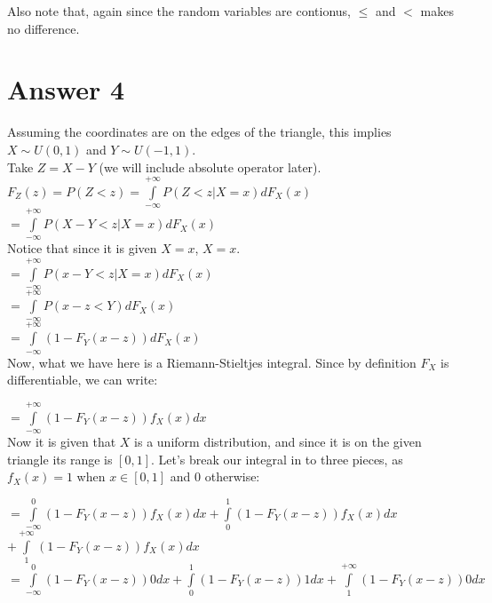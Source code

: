 \documentclass[12pt]{article}
\begin{document}
Also note that, again since the random variables are contionus, $\leq$ and $<$ makes no difference.




\section*{Answer 4}

Assuming the coordinates are on the edges of the triangle, this implies $X \sim U(0,1)$ and $Y \sim U(-1,1)$. \\

Take $Z=X-Y$ (we will include absolute operator later). \\

$F_Z(z) = P(Z<z) = \displaystyle\int\limits_{-\infty}^{+\infty} P(Z<z|X=x)dF_X(x)  $\\

$ = \displaystyle\int\limits_{-\infty}^{+\infty} P(X-Y<z | X=x)dF_X(x) $ \\

Notice that since it is given $X=x$, $X=x$.\\

$ = \displaystyle\int\limits_{-\infty}^{+\infty} P(x-Y<z | X=x)dF_X(x) $ \\

$ = \displaystyle\int\limits_{-\infty}^{+\infty} P( x-z <Y )dF_X(x) $ \\

$ = \displaystyle\int\limits_{-\infty}^{+\infty} ( 1-  F_Y(x-z) )  dF_X(x) $ \\

Now, what we have here is a Riemann-Stieltjes integral. Since by definition $F_X$ is differentiable, we can write:

$ = \displaystyle\int\limits_{-\infty}^{+\infty} ( 1-  F_Y(x-z) ) f_X(x)dx $ \\ 

Now it is given that $X$ is a uniform distribution, and since it is on the given triangle its range is $[0,1]$. Let's break our integral in to three pieces, as $f_X(x) = 1$ when $x\in [0,1]$ and $0$ otherwise:

$ =\displaystyle\int\limits_{-\infty}^{0} ( 1- F_Y(x-z) ) f_X(x) dx + \displaystyle\int\limits_{0}^{1} ( 1- F_Y(x-z) ) f_X(x) dx $\\$+ \displaystyle\int\limits_{1}^{+\infty} ( 1- F_Y(x-z) ) f_X(x) dx $ \\ 

$ =\displaystyle\int\limits_{-\infty}^{0} ( 1- F_Y(x-z) ) 0dx + \displaystyle\int\limits_{0}^{1} ( 1- F_Y(x-z) ) 1dx + \displaystyle\int\limits_{1}^{+\infty} ( 1- F_Y(x-z) ) 0dx $ \\ 
\end{document}
